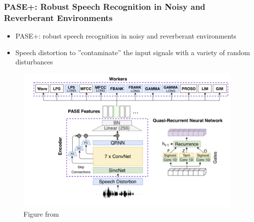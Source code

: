 \documentclass[table]{beamer}
\begin{document}
\begin{frame}
\frametitle{PASE+:  Robust Speech Recognition in Noisy and Reverberant Environments}

		\begin{itemize}
			\item PASE+:  robust speech recognition in noisy and reverberant environments \citep{ravanelli2020multitask}
			\item Speech distortion to ''contaminate'' the input signals with a variety of random disturbances
		\end{itemize} 


		\begin{figure}
			\centering
			\includegraphics[scale=0.3]	{PASEplus} 
			\caption{Figure from \citep{ravanelli2020multitask}}
			\end{figure}

\end{frame}
\end{document}
